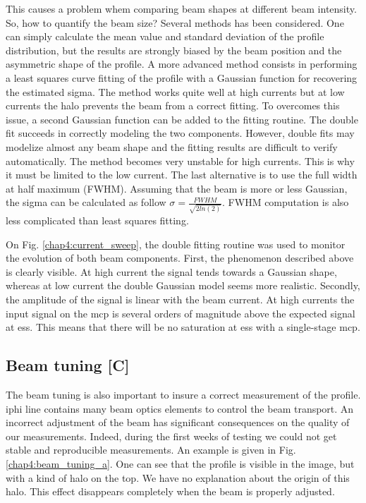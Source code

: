 \begin{refsection}
  

  This causes a problem whem comparing beam shapes at different beam intensity. So, how to quantify the beam size? Several methods has been considered. One can simply calculate the mean value and standard deviation of the profile distribution, but the results are strongly biased by the beam position and the asymmetric shape of the profile. A more advanced method consists in performing a least squares curve fitting of the profile with a Gaussian function for recovering the estimated sigma. The method works quite well at high currents but at low currents the halo prevents the beam from a correct fitting. To overcomes this issue, a second Gaussian function can be added to the fitting routine. The double fit succeeds in correctly modeling the two components. However, double fits may modelize almost any beam shape and the fitting results are difficult to verify automatically. The method becomes very unstable for high currents. This is why it must be limited to the low current. The last alternative is to use the full width at half maximum (FWHM). Assuming that the beam is more or less Gaussian, the sigma can be calculated as follow $\sigma = \frac{FWHM}{\sqrt{2ln(2)}}$. FWHM computation is also less complicated than least squares fitting.

  

  On Fig. \ref{chap4:current_sweep}, the double fitting routine was used to monitor the evolution of both beam components. First, the phenomenon described above is clearly visible. At high current the signal tends towards a Gaussian shape, whereas at low current the double Gaussian model seems more realistic. Secondly, the amplitude of the signal is linear with the beam current. At high currents the input signal on the \acrshort{mcp} is several orders of magnitude above the expected signal at \acrshort{ess}. This means that there will be no saturation at \acrshort{ess} with a single-stage \acrshort{mcp}.

  \subsection{Beam tuning [C]}
  The beam tuning is also important to insure a correct measurement of the profile. \acrshort{iphi} line contains many beam optics elements to control the beam transport. An incorrect adjustment of the beam has significant consequences on the quality of our measurements. Indeed, during the first weeks of testing we could not get stable and reproducible measurements. An example is given in Fig. \ref{chap4:beam_tuning_a}. One can see that the profile is visible in the image, but with a kind of halo on the top. We have no explanation about the origin of this halo. This effect disappears completely when the beam is properly adjusted.


\end{refsection}

